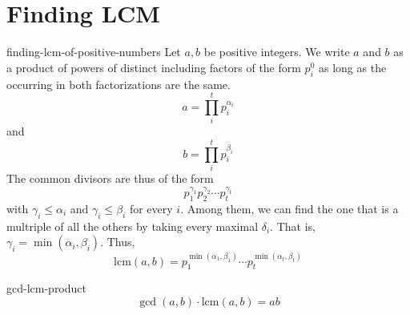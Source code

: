\documentclass[preview]{standalone}
\begin{document}
\section{Finding LCM}

\begin{snippet}{finding-lcm-of-positive-numbers}
    Let \(a, b\) be positive integers. We write \(a\) and \(b\)
    as a product of powers of distinct \primen[primes] including factors of the form \(p_i^0\)
    as long as the occurring \primen[primes] in both factorizations are the same.
    \[
        a = \prod_{i}^t p_i^{\alpha_i}
    \]
    and
    \[
        b = \prod_{i}^t p_i^{\beta_i}
    \]
    The common divisors are thus of the form
    \[
        p_1^{\gamma_1}p_2^{\gamma_2}\cdots p_t^{\gamma_t}
    \]
    with \(\gamma_i \leq \alpha_i\) and \(\gamma_i \leq \beta_i\)
    for every \(i\).
    Among them, we can find the one that is a multriple of all the others by taking every maximal \(\delta_i\).
    That is, \(\gamma_i = \min(\alpha_i, \beta_i)\).
    Thus,
    \[
        \text{lcm}(a,b) = p_1^{\min(\alpha_1, \beta_1)} \cdots
        p_t^{\min(\alpha_t, \beta_t)}
    \]
\end{snippet}

\begin{snippetproposition}{gcd-lcm-product}{}
    \[
        \gcd(a,b) \cdot \text{lcm}(a,b) = ab
    \]
\end{snippetproposition}
\end{document}
